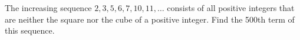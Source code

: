 The increasing sequence $2,3,5,6,7,10,11,\ldots$ consists of all positive integers that are neither the square nor the cube of a positive integer. Find the 500th term of this sequence.